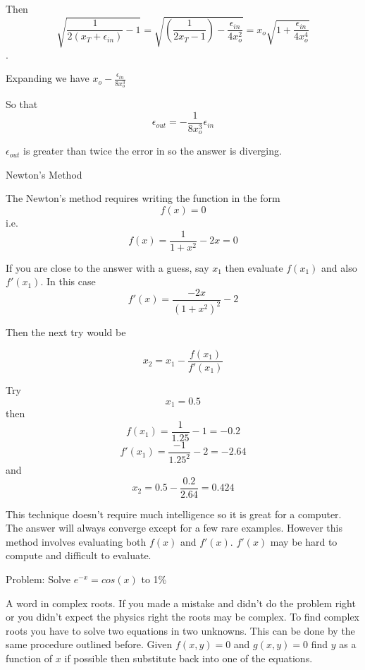 \documentclass[a4paper,10pt]{article}
\begin{document}
Then $$\sqrt{\frac{1}{2(x_T+\epsilon_{in})}-1}=\sqrt{(\frac{1}{2x_T-1})-\frac{\epsilon_{in}}{4x_o^2}}=x_o\sqrt{1+\frac{\epsilon_{in}}{4x_o^4}}$$.

Expanding we have $x_o-\frac{\epsilon_{in}}{8x_o^3}$

So that $$\epsilon_{out}=-\frac{1}{8x_o^3}\epsilon_{in}$$

$\epsilon_{out}$ is greater than twice the error in so the answer is diverging. 

\begin{center}
Newton's Method
\end{center}
The Newton's method requires writing the function in the form
$$f(x)=0$$ i.e. 
$$f(x)=\frac{1}{1+x^2} - 2x = 0$$

If you are close to the answer with a guess, say $x_{1}$ then evaluate $f(x_{1})$ and also $f'(x_{1})$. In this case
$$f'(x) = \frac{-2x}{(1+x^2)^2} - 2$$

Then the next try would be

$$x_{2}=x_{1}-\frac{f(x_{1})}{f'(x_{1})}$$

Try $$x_{1}=0.5$$ then 
$$f(x_{1})=\frac{1}{1.25}-1=-0.2$$
$$f'(x_{1})=\frac{-1}{1.25^2}-2=-2.64$$
and $$x_{2}=0.5-\frac{0.2}{2.64}=0.424$$

This technique doesn't require much intelligence so it is great for a computer. 
The answer will always converge except for a few rare examples. 
However this method involves evaluating both $f(x)$ and $f'(x)$. 
$f'(x)$ may be hard to compute and difficult to evaluate.

\begin{center}
Problem: Solve $e^{-x}=cos(x)$ to 1\%
\end{center}

A word in complex roots. If you made a mistake and didn't do the problem right or you didn't expect the 
physics right the roots may be complex. To find complex roots you have to solve two equations in two unknowns. 
This can be done by the same procedure outlined before. Given $f(x,y)=0$ and $g(x,y)=0$ find $y$ as a function
of $x$ if possible then substitute back into one of the equations.
\end{document}
